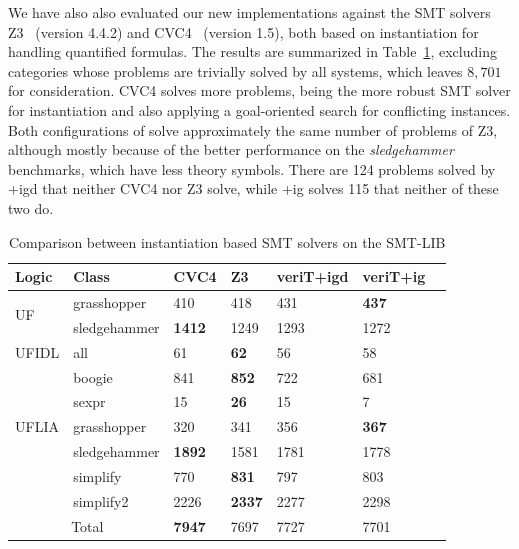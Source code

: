 \message{ !name(main.tex)}\documentclass{easychair}
\begin{document}
We have also also evaluated our new implementations against the SMT
solvers \textsc{Z3}~\cite{deMoura2008-z3} (version 4.4.2) and
\textsc{CVC4}~\cite{Barrett2011} (version 1.5), both based on
instantiation for handling quantified formulas. The results are
summarized in Table~\ref{tab:comparison}, excluding categories whose
problems are trivially solved by all systems, which leaves $8,701$ for
consideration. \textsc{CVC4} solves more problems, being the more
robust SMT solver for instantiation and also applying a goal-oriented
search for conflicting instances. Both configurations of {\verit}
solve approximately the same number of problems of \textsc{Z3},
although mostly because of the better performance on the
\emph{sledgehammer} benchmarks, which have less theory symbols. There
are 124 problems solved by {\verit}+igd that neither \textsc{CVC4} nor
\textsc{Z3} solve, while {\verit}+ig solves 115 that neither of these
two do.

\begin{table}[htbp]
  \centering
  \begin{tabular}{|l|l|l|l|l|l|l|}
    \hline
    Logic & Class & CVC4 & Z3 & veriT+igd & veriT+ig \\
    \hline
    \multirow{2}{*}{UF}&grasshopper&410&418&431&\textbf{437}\\
          &sledgehammer&\textbf{1412}&1249&1293&1272\\
    \hline
    UFIDL&all&61&\textbf{62}&56&58\\
    \hline
    \multirow{5}{*}{UFLIA}&boogie&841&\textbf{852}&722&681\\
          &sexpr&15&\textbf{26}&15&7\\
          &grasshopper&320&341&356&\textbf{367}\\
          &sledgehammer&\textbf{1892}&1581&1781&1778\\
          &simplify&770&\textbf{831}&797&803\\
          &simplify2&2226&\textbf{2337}&2277&2298\\
    \hline
    \multicolumn{2}{|c|}{Total}&\textbf{7947}&7697&7727&7701\\
    \hline
  \end{tabular}

  \caption{Comparison between instantiation based SMT solvers on the SMT-LIB}
  \label{tab:comparison}
\end{table}
\end{document}
